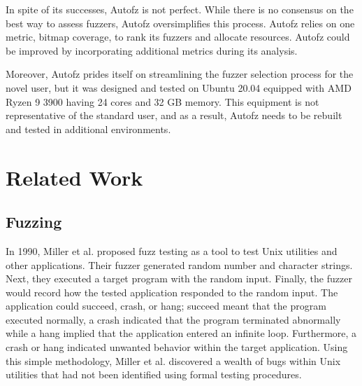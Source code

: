 In spite of its successes, Autofz is not perfect. While there is no consensus on
the best way to assess fuzzers, Autofz oversimplifies this process. Autofz relies
on one metric, bitmap coverage, to rank its fuzzers and allocate resources. Autofz
could be improved by incorporating additional metrics during its analysis.

Moreover, Autofz prides itself on streamlining the fuzzer selection process for
the novel user, but it was designed and tested on Ubuntu 20.04 equipped with AMD
Ryzen 9 3900 having 24 cores and 32 GB memory. This equipment is not representative
of the standard user, and as a result, Autofz needs to be rebuilt and tested in
additional environments. \cite{Fu}

\section{Related Work}

\subsection{Fuzzing}
In 1990, Miller et al. proposed fuzz testing as a tool to test Unix utilities
and other applications. Their fuzzer generated random number and character
strings. Next, they executed a target program with the random input. Finally,
the fuzzer would record how the tested application responded to the random input.
The application could succeed, crash, or hang; succeed meant that the program
executed normally, a crash indicated that the program terminated abnormally while
a hang implied that the application entered an infinite loop. Furthermore, a
crash or hang indicated unwanted behavior within the target application. Using this
simple methodology, Miller et al. discovered a wealth of bugs within Unix utilities
that had not been identified using formal testing procedures. \cite{Miller}


